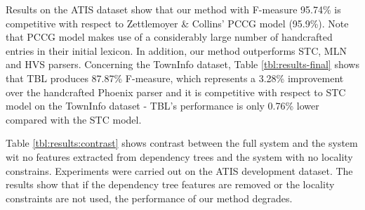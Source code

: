 \documentclass{article}
\newcommand{\efgr}[2]{
  \begin{figure}[htbp]
    \makebox[8.5cm]{\framebox[5cm]{\rule{0pt}{5cm}}}
    \caption{#2}
    \label{#1}
  \end{figure}
}
\begin{document}
Results on the ATIS dataset show that our method with F-measure 95.74\% is competitive with respect to Zettlemoyer \& Collins' PCCG model \cite{zettlemoyer07} (95.9\%). Note that PCCG model makes use of a considerably large number of handcrafted entries in their initial lexicon. In addition, our method outperforms STC, MLN and HVS parsers. Concerning the TownInfo dataset, Table \ref{tbl:results-final} shows that TBL produces 87.87\% F-measure, which represents a 3.28\% improvement over the handcrafted Phoenix parser and it is competitive with respect to STC model on the TownInfo dataset - TBL's performance is only 0.76\% lower compared with the STC model.




Table \ref{tbl:results:contrast} shows contrast between the full system and the system wit no features extracted from dependency trees and the system with no locality constrains. Experiments were carried out on the ATIS development dataset. The results show that if the dependency tree features are removed or the locality constraints are not used, the performance of our method degrades.
\end{document}
